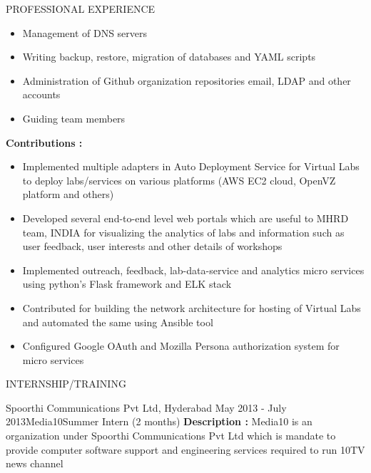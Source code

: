 \documentclass{resume} %
\begin{document}
\begin{rSection}{PROFESSIONAL EXPERIENCE}
\begin{rSubsection}
\begin{itemize}
    \item Management of DNS servers

    \item Writing backup, restore, migration of databases
      and YAML scripts

    \item Administration of Github organization repositories
      email, LDAP and other accounts

    \item Guiding team members
    \end{itemize}

    \hfill

    \textbf{Contributions : }
    \begin{itemize}

    \item Implemented multiple adapters in Auto Deployment
      Service for Virtual Labs to deploy labs/services on
      various platforms (AWS EC2 cloud, OpenVZ platform and
      others)
      
    \item Developed several end-to-end level web portals
      which are useful to MHRD team, INDIA for visualizing
      the analytics of labs and information such as user
      feedback, user interests and other details of
      workshops
      
    \item Implemented outreach, feedback, lab-data-service
      and analytics micro services using python's Flask
      framework and ELK stack
      
    \item Contributed for building the network architecture
      for hosting of Virtual Labs and automated the same
      using Ansible tool

    \item Configured Google OAuth and Mozilla Persona
      authorization system for micro services
    \end{itemize}
 
  \end{rSubsection}

\end{rSection}


\begin{rSection}{INTERNSHIP/TRAINING}
  \begin{rSubsection}
  {Spoorthi Communications Pvt Ltd, Hyderabad} {May 2013 - July
    2013}{Media10}{Summer Intern (2 months)} \textbf{Description :}
  Media10 is an organization under Spoorthi Communications Pvt Ltd
  which is mandate to provide computer software support and
  engineering services required to run 10TV news channel
  \end{rSubsection} 

\end{rSection} 
\end{document}
